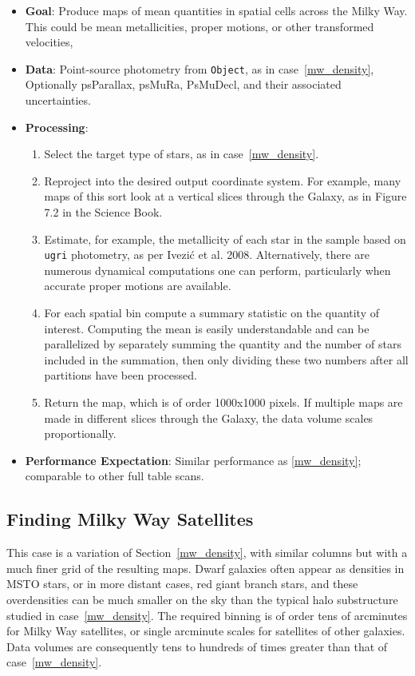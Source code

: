 \documentclass[DM,authoryear,toc]{lsstdoc}
\begin{document}
\begin{itemize}
  \item \textbf{Goal}: Produce maps of mean quantities in spatial cells across
  the Milky Way. This could be mean metallicities, proper motions, or other
  transformed velocities,
  \item \textbf{Data}: Point-source photometry from \texttt{Object}, as in
  case~\ref{mw_density}, Optionally psParallax, psMuRa, PsMuDecl, and their
  associated uncertainties.
  \item \textbf{Processing}:
    \begin{enumerate}
      \item Select the target type of stars, as in case~\ref{mw_density}.
      \item Reproject into the desired output coordinate system. For example,
      many maps of this sort look at a vertical slices through the Galaxy, as in
      Figure 7.2 in the Science Book.
      \item Estimate, for example, the metallicity of each star in the sample
      based on \texttt{ugri} photometry, as per Ivezi\'{c} et al. 2008.
      Alternatively, there are numerous dynamical computations one can perform,
      particularly when accurate proper motions are available.
      \item For each spatial bin compute a summary statistic on the quantity of
      interest. Computing the mean is easily understandable and can be
      parallelized by separately summing the quantity and the number of stars
      included in the summation, then only dividing these two numbers after all
      partitions have been processed.
      \item Return the map, which is of order 1000x1000 pixels. If multiple maps
      are made in different slices through the Galaxy, the data volume scales proportionally.
    \end{enumerate}
    \item \textbf{Performance Expectation}: Similar performance as
    \ref{mw_density}; comparable to other full table scans.
\end{itemize}

\subsection{Finding Milky Way Satellites}
\label{mw_sats}

This case is a variation of Section~\ref{mw_density}, with similar columns but with
a much finer grid of the resulting maps. Dwarf galaxies often appear as
densities in MSTO stars, or in more distant cases, red giant branch stars, and
these overdensities can be much smaller on the sky than the typical halo
substructure studied in case~\ref{mw_density}. The required binning is of order
tens of arcminutes for Milky Way satellites, or single arcminute scales for
satellites of other galaxies. Data volumes are consequently tens to hundreds of
times greater than that of case~\ref{mw_density}.
\end{document}
